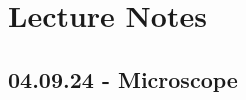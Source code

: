 \chapter{Lecture Notes}
\setlength{\headheight}{12.71342pt}
\addtolength{\topmargin}{-0.71342pt}

\section{04.09.24 - Microscope}
